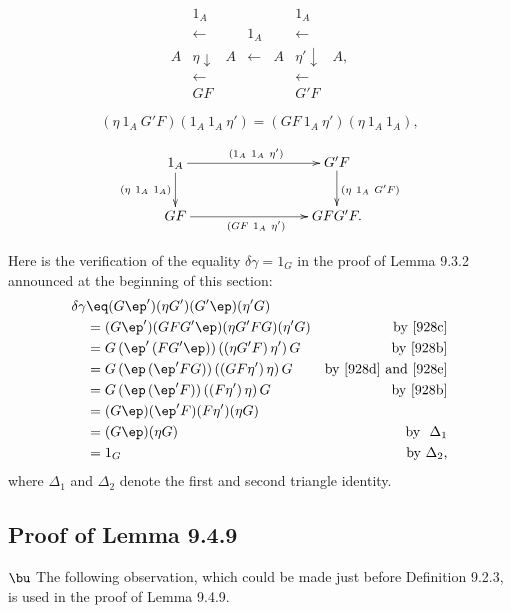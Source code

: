 \documentclass[12pt]{article}
\begin{document}
$$
\begin{array}{ccccccc}
&1_A&&&&1_A\\
&\leftarrow&&1_A&&\leftarrow\\
A&\eta\downarrow&A&\leftarrow&A&\eta'\downarrow&A,\\
&\leftarrow&&&&\leftarrow\\
&GF&&&&G'F
\end{array}
$$

\begin{equation}\label{928e}
(\eta\ 1_A\ G'F)(1_A\ 1_A\ \eta')=(GF\ 1_A\ \eta')(\eta\ 1_A\ 1_A),
\end{equation}

$$
\xymatrix{
1_A\ar[rrr]^{(1_A\ 1_A\ \eta')}\ar[d]_{(\eta\ 1_A\ 1_A)}&&&G'F\ar[d]^{(\eta\ 1_A\ G'F)}\\ 
GF\ar[rrr]_{(GF\ 1_A\ \eta')}&&&GFG'F.}
$$ 



Here is the verification of the equality $\delta\gamma=1_G$ in the proof of Lemma 9.3.2 announced at the beginning of this section: 
\begin{align*}
\delta\gamma &\eq(G\ep')(\eta G')(G'\ep)(\eta'G)\\
&=(G\ep')(G F G'\ep)(\eta G' F G)(\eta'G)&\text{by \eqref{928c}}\\
&=G\,(\ep'\,(FG'\ep))\,((\eta G'F)\,\eta')\,G&\text{by \eqref{928b}}\\
&=G\,(\ep\,(\ep'FG))\,((GF\eta')\,\eta)\,G&\text{by \eqref{928d} and \eqref{928e}}\\
&=G\,(\ep\,(\ep'F))\,((F\eta')\,\eta)\,G&\text{by \eqref{928b}}\\
&=(G\ep)(\ep' F)(F\eta')(\eta G)\\
&=(G\ep)(\eta G)&\text{by $\ \Delta_1$}\\
&=1_G&\text{by $\Delta_2$,}
\end{align*} 
where $\Delta_1$ and $\Delta_2$ denote the first and second triangle identity.


\subsection{Proof of Lemma 9.4.9}

$\bu$ The following observation, which could be made just before Definition 9.2.3, is used in the proof of Lemma 9.4.9.
\end{document}
